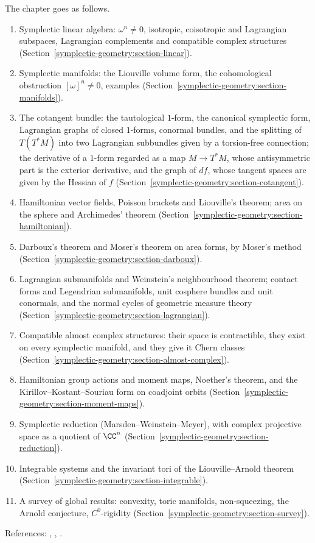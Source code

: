 The chapter goes as follows.
\begin{enumerate}
\item Symplectic linear algebra: $\omega^n \neq 0$, isotropic, coisotropic and Lagrangian subspaces, Lagrangian complements and compatible complex structures
(Section~\ref{symplectic-geometry:section-linear}).
\item Symplectic manifolds: the Liouville volume form, the cohomological obstruction $[\omega]^n \neq 0$, examples (Section~\ref{symplectic-geometry:section-manifolds}).
\item The cotangent bundle: the tautological $1$-form, the canonical symplectic form, Lagrangian graphs of closed $1$-forms, conormal bundles, and the splitting of $T(T^*M)$ into two Lagrangian
subbundles given by a torsion-free connection; the derivative of a $1$-form regarded as a map $M \to T^*M$, whose antisymmetric part is the exterior derivative, and the graph of $df$, whose
tangent spaces are given by the Hessian of $f$ (Section~\ref{symplectic-geometry:section-cotangent}).
\item Hamiltonian vector fields, Poisson brackets and Liouville's theorem; area on the sphere and Archimedes' theorem (Section~\ref{symplectic-geometry:section-hamiltonian}).
\item Darboux's theorem and Moser's theorem on area forms, by Moser's method (Section~\ref{symplectic-geometry:section-darboux}).
\item Lagrangian submanifolds and Weinstein's neighbourhood theorem; contact forms and Legendrian submanifolds, unit cosphere bundles and unit conormals, and the normal cycles
of geometric measure theory (Section~\ref{symplectic-geometry:section-lagrangian}).
\item Compatible almost complex structures: their space is contractible, they exist on every symplectic manifold, and they give it Chern classes
(Section~\ref{symplectic-geometry:section-almost-complex}).
\item Hamiltonian group actions and moment maps, Noether's theorem, and the Kirillov--Kostant--Souriau form on coadjoint orbits (Section~\ref{symplectic-geometry:section-moment-maps}).
\item Symplectic reduction (Marsden--Weinstein--Meyer), with complex projective space as a quotient of $\CC^n$ (Section~\ref{symplectic-geometry:section-reduction}).
\item Integrable systems and the invariant tori of the Liouville--Arnold theorem (Section~\ref{symplectic-geometry:section-integrable}).
\item A survey of global results: convexity, toric manifolds, non-squeezing, the Arnold conjecture, $C^0$-rigidity (Section~\ref{symplectic-geometry:section-survey}).
\end{enumerate}
References: \cite{cannas-da-silva}, \cite{mcduff-salamon}, \cite[Chapter 22]{lee-smooth-manifolds}.

